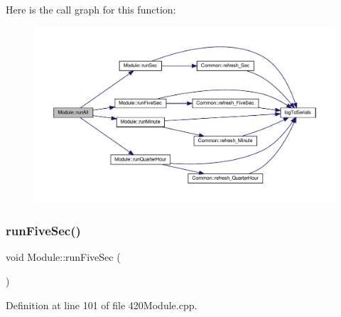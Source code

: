 Here is the call graph for this function\+:
\nopagebreak
\begin{figure}[H]
\begin{center}
\leavevmode
\includegraphics[width=350pt]{class_module_a7ed8e04ba630f6734ac15d06c4eae999_cgraph}
\end{center}
\end{figure}
\mbox{\label{class_module_adb37fcc3cf7c1a693e5b6e92a873bf72}} 
\subsubsection{\texorpdfstring{run\+Five\+Sec()}{runFiveSec()}\hspace{0.1cm}{\footnotesize\ttfamily [1/2]}}
{\footnotesize\ttfamily void Module\+::run\+Five\+Sec (\begin{DoxyParamCaption}{ }\end{DoxyParamCaption})}



Definition at line 101 of file 420\+Module.\+cpp.

